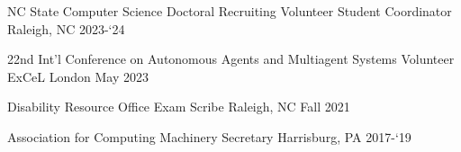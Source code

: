 

\begin{cvhonors}
  \cvhonor
    {NC State Computer Science Doctoral Recruiting} %
    {Volunteer Student Coordinator} %
    {Raleigh, NC} %
    {2023-`24} %
    

  \cvhonor
    {22nd Int'l Conference on Autonomous Agents and Multiagent Systems} %
    {Volunteer} %
    {ExCeL London} %
    {May 2023} %

  \cvhonor
    {Disability Resource Office} %
    {Exam Scribe} %
    {Raleigh, NC} %
    {Fall 2021} %
    
  \cvhonor
    {Association for Computing Machinery} %
    {Secretary} %
    {Harrisburg, PA} %
    {2017-`19} %
    
\end{cvhonors}



